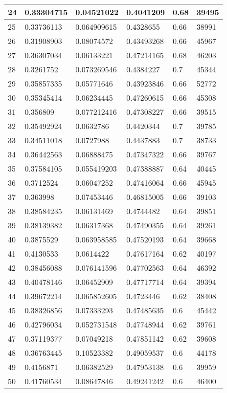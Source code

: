 \begin{longtable}{|l|l|l|l|l|l|}
24 & 0.33304715 & 0.04521022 & 0.4041209 & 0.68 & 39495 \\ \hline 
25 & 0.33736113 & 0.064909615 & 0.4328655 & 0.66 & 38991 \\ \hline 
26 & 0.31908903 & 0.08074572 & 0.43493268 & 0.66 & 45967 \\ \hline 
27 & 0.36307034 & 0.06133221 & 0.47214165 & 0.68 & 46203 \\ \hline 
28 & 0.3261752 & 0.073269546 & 0.4384227 & 0.7 & 45344 \\ \hline 
29 & 0.35857335 & 0.05771646 & 0.43923846 & 0.66 & 52772 \\ \hline 
30 & 0.35345414 & 0.06234445 & 0.47260615 & 0.66 & 45308 \\ \hline 
31 & 0.356809 & 0.077212416 & 0.47308227 & 0.66 & 39515 \\ \hline 
32 & 0.35492924 & 0.0632786 & 0.4420344 & 0.7 & 39785 \\ \hline 
33 & 0.34511018 & 0.0727988 & 0.4437883 & 0.7 & 38733 \\ \hline 
34 & 0.36442563 & 0.06888475 & 0.47347322 & 0.66 & 39767 \\ \hline 
35 & 0.37584105 & 0.055419203 & 0.47388887 & 0.64 & 40445 \\ \hline 
36 & 0.3712524 & 0.06047252 & 0.47416064 & 0.66 & 45945 \\ \hline 
37 & 0.363998 & 0.07453446 & 0.46815005 & 0.66 & 39103 \\ \hline 
38 & 0.38584235 & 0.06131469 & 0.4744482 & 0.64 & 39851 \\ \hline 
39 & 0.38139382 & 0.06317368 & 0.47490355 & 0.64 & 39261 \\ \hline 
40 & 0.3875529 & 0.063958585 & 0.47520193 & 0.64 & 39668 \\ \hline 
41 & 0.4130533 & 0.0614422 & 0.47617164 & 0.62 & 40197 \\ \hline 
42 & 0.38456088 & 0.076141596 & 0.47702563 & 0.64 & 46392 \\ \hline 
43 & 0.40478146 & 0.06452909 & 0.47717714 & 0.64 & 39394 \\ \hline 
44 & 0.39672214 & 0.065852605 & 0.4723446 & 0.62 & 38408 \\ \hline 
45 & 0.38326856 & 0.07333293 & 0.47485635 & 0.6 & 45442 \\ \hline 
46 & 0.42796034 & 0.052731548 & 0.47748944 & 0.62 & 39761 \\ \hline 
47 & 0.37119377 & 0.07049218 & 0.47851142 & 0.62 & 39608 \\ \hline 
48 & 0.36763445 & 0.10523382 & 0.49059537 & 0.6 & 44178 \\ \hline 
49 & 0.4156871 & 0.06382529 & 0.47953138 & 0.6 & 39959 \\ \hline 
50 & 0.41760534 & 0.08647846 & 0.49241242 & 0.6 & 46400 \\ \hline 
\end{longtable}